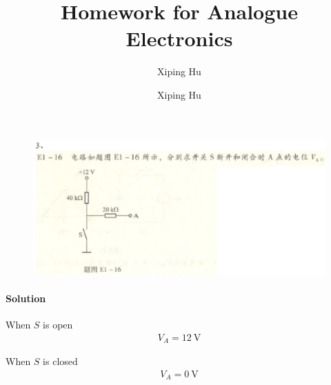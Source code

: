 \documentclass{article}
\author{Xiping Hu}
\author{Xiping Hu}
\affil{http://thehxp.tech/}
\title{Homework for Analogue Electronics}
\begin{document}
\maketitle

\begin{figure}[H]
  \centering
  \includegraphics[width=\linewidth]{figures/3}
  \label{fig:}
\end{figure}

\paragraph{Solution}

When $S$ is open
\begin{equation*}
  \begin{aligned}
    V_A = 12 \  \mathrm{V}
  \end{aligned}
\end{equation*}

When $S$ is closed
\begin{equation*}
  \begin{aligned}
    V_A = 0 \  \mathrm{V}
  \end{aligned}
\end{equation*}
\end{document}
